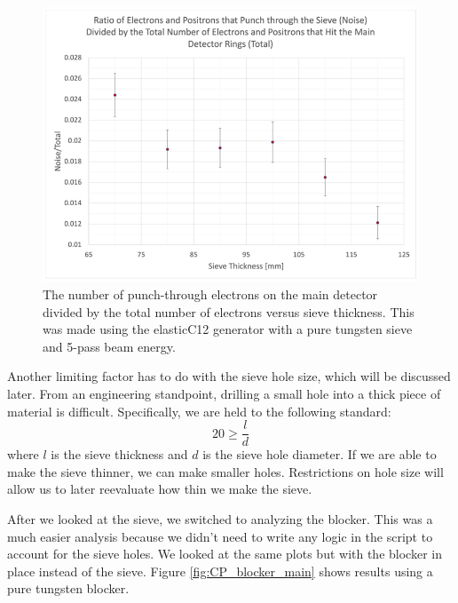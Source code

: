 \begin{figure}[H]
    \centering
    \includegraphics[scale=0.4]{Images/RatioNoiseToTotal_09162021.png}
    \caption{The number of punch-through electrons on the main detector divided by the total number of electrons versus sieve thickness. This was made using the elasticC12 generator with a pure tungsten sieve and 5-pass beam energy.}
    \label{fig:sieve_noise_total}
\end{figure}

Another limiting factor has to do with the sieve hole size, which will be discussed later. From an engineering standpoint, drilling a small hole into a thick piece of material is difficult. Specifically, we are held to the following standard:
\begin{equation}
    20\geq\frac{l}{d}\nonumber
\end{equation}
where $l$ is the sieve thickness and $d$ is the sieve hole diameter. If we are able to make the sieve thinner, we can make smaller holes. Restrictions on hole size will allow us to later reevaluate how thin we make the sieve.

After we looked at the sieve, we switched to analyzing the blocker. This was a much easier analysis because we didn't need to write any logic in the script to account for the sieve holes. We looked at the same plots but with the blocker in place instead of the sieve. Figure \ref{fig:CP_blocker_main} shows results using a pure tungsten blocker.

